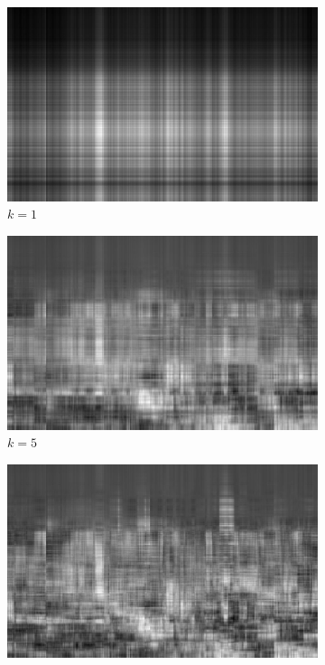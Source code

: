 \documentclass[11pt,a4paper]{article}
\begin{document}
\begin{figure}[H]
  \centering
  \begin{subfigure}[t]{.5\textwidth}
    \centering
    \includegraphics[scale=0.15]{img/k1_new_york}
    \caption{$k = 1$}
  \end{subfigure}%
  \begin{subfigure}[t]{.5\textwidth}
    \centering
    \includegraphics[scale=0.15]{img/k5_new_york}
    \caption{$k = 5$}
  \end{subfigure}
  \begin{subfigure}[t]{.5\textwidth}
    \centering
    \includegraphics[scale=0.15]{img/k10_new_york}

\end{subfigure}
\end{figure}
\end{document}
